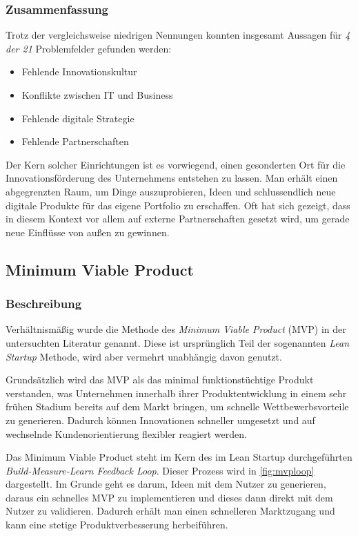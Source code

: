 \subsubsection{Zusammenfassung}

Trotz der vergleichsweise niedrigen Nennungen konnten insgesamt Aussagen für \textit{4 der 21} Problemfelder gefunden werden:

\begin{itemize}[noitemsep, topsep=0pt]
	\item Fehlende Innovationskultur
	\item Konflikte zwischen IT und Business
	\item Fehlende digitale Strategie
	\item Fehlende Partnerschaften
\end{itemize}

Der Kern solcher Einrichtungen ist es vorwiegend, einen gesonderten Ort für die Innovationsförderung des Unternehmens entstehen zu lassen. Man erhält einen abgegrenzten Raum, um Dinge auszuprobieren, Ideen und schlussendlich neue digitale Produkte für das eigene Portfolio zu erschaffen. Oft hat sich gezeigt, dass in diesem Kontext vor allem auf externe Partnerschaften gesetzt wird, um gerade neue Einflüsse von außen zu gewinnen. 

\subsection{Minimum Viable Product}

\subsubsection{Beschreibung}

Verhältnismäßig wurde die Methode des \textit{Minimum Viable Product} (MVP) in der untersuchten Literatur genannt. Diese ist ursprünglich Teil der sogenannten \textit{Lean Startup} Methode, wird aber vermehrt unabhängig davon genutzt.

Grundsätzlich wird das MVP als das minimal funktionstüchtige Produkt verstanden, was Unternehmen innerhalb ihrer Produktentwicklung in einem sehr frühen Stadium bereits auf dem Markt bringen, um schnelle Wettbewerbsvorteile zu generieren. Dadurch können Innovationen schneller umgesetzt und auf wechselnde Kundenorientierung flexibler reagiert werden. \cite{depiereux_minimum_2019}

Das Minimum Viable Product steht im Kern des im Lean Startup durchgeführten \textit{Build-Measure-Learn Feedback Loop}. Dieser Prozess wird in \ref{fig:mvploop} dargestellt. Im Grunde geht es darum, Ideen mit dem Nutzer zu generieren, daraus ein schnelles MVP zu implementieren und dieses dann direkt mit dem Nutzer zu validieren. Dadurch erhält man einen schnelleren Marktzugang und kann eine stetige Produktverbesserung herbeiführen. \cite[S. 102]{grote_fuhrungsinstrumente_2018}

